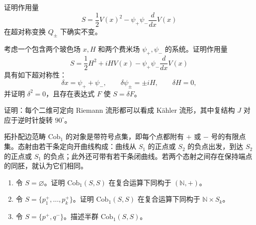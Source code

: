 \begin{exercise}\label{exer:susy-invariant-action}
证明作用量
\[
  S=\frac12V(x)^2-\psi_+\psi_-\frac{d}{dx}V(x)
\]
在超对称变换 $Q_\pm$ 下确实不变。
\end{exercise}

\begin{exercise}\label{exer:susy-auxiliary-field}
考虑一个包含两个玻色场 $x,H$ 和两个费米场 $\psi_+,\psi_-$ 的系统。证明作用量
\[
  S=\frac12H^2+iHV(x)-\psi_+\psi_-\frac{d}{dx}V(x)
\]
具有如下超对称性：
\[
  \delta x=\psi_++\psi_-,\qquad
  \delta\psi_\pm=\pm iH,\qquad \delta H=0,
\]
并证明 $\delta^2=0$，且存在表达式 $F$ 使 $S=\delta F$。
\end{exercise}

\begin{exercise}\label{exer:oriented-riemann-kaehler}
证明：每个二维可定向 Riemann 流形都可以看成 Kähler 流形，其中复结构 $J$ 对应于逆时针旋转 $90^\circ$。
\end{exercise}

\begin{exercise}\label{exer:cobordism-one-category}
拓扑配边范畴 $\mathrm{Cob}_1$ 的对象是带符号点集，即每个点都附有 $+$ 或 $-$ 号的有限点集。态射由若干条定向开曲线构成：曲线从 $S_1$ 的正点或 $S_2$ 的负点出发，到达 $S_2$ 的正点或 $S_1$ 的负点；此外还可带有若干条闭曲线。若两个态射之间存在保持端点的同胚，就认为它们相同。
\begin{enumerate}[label=(\roman*)]
  \item 令 $S=\varnothing$。证明 $\mathrm{Cob}_1(S,S)$ 在复合运算下同构于 $(\mathbb N,+)$。
  \item 令 $S=\{p_1^+,\ldots,p_k^+\}$。证明 $\mathrm{Cob}_1(S,S)$ 在复合运算下同构于 $\mathbb N\times S_k$。
  \item 令 $S=\{p^+,q^-\}$。描述半群 $\mathrm{Cob}_1(S,S)$。
\end{enumerate}
\end{exercise}

